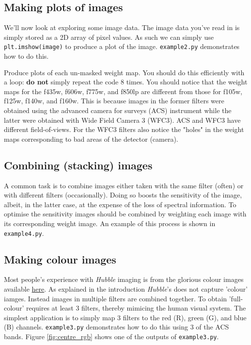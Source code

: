 \documentclass{article}
\begin{document}
\subsection{Making plots of images}

We'll now look at exploring some image data. The image data you've read in is simply stored as a 2D array of pixel values. As such we can simply use \texttt{plt.imshow(image)} to produce a plot of the image. \texttt{example2.py} demonstrates how to do this.

\begin{question}
Produce plots of each un-masked weight map. You should do this efficiently with a loop: \textbf{do not} simply repeat the code 8 times. You should notice that the weight maps for the f435w, f606w, f775w, and f850lp are different from those for f105w, f125w, f140w, and f160w. This is because images in the former filters were obtained using the advanced camera for surveys (ACS) instrument while the latter were obtained with Wide Field Camera 3 (WFC3). ACS and WFC3 have different field-of-views. For the WFC3 filters also notice the "holes" in the weight maps corresponding to bad areas of the detector (camera).
\end{question}



\subsection{Combining (stacking) images}

A common task is to combine images either taken with the same filter (often) or with different filters (occasionally). Doing so boosts the sensitivity of the image, albeit, in the latter case, at the expense of the loss of spectral information. To optimise the sensitivity images should be combined by weighting each image with its corresponding weight image. An example of this process is shown in \texttt{example4.py}.


\subsection{Making colour images}

Most people's experience with {\em Hubble} imaging is from the glorious colour images available \href{https://hubblesite.org}{here}. As explained in the introduction {\em Hubble}'s does not capture 'colour' iamges. Instead images in multiple filters are combined together. To obtain 'full-colour' requires at least 3 filters, thereby mimicing the human visual system. The simplest application is to simply map 3 filters to the red (R), green (G), and blue (B) channels. \texttt{example3.py} demonstrates how to do this using 3 of the ACS bands. Figure \ref{fig:centre_rgb} shows one of the outputs of \texttt{example3.py}.
\end{document}
